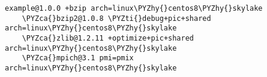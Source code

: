 \begin{Verbatim}[commandchars=\\\{\},fontsize=\footnotesize]
example@1.0.0 +bzip arch=linux\PYZhy{}centos8\PYZhy{}skylake
    \PYZca{}bzip2@1.0.8 \PYZti{}debug+pic+shared arch=linux\PYZhy{}centos8\PYZhy{}skylake
    \PYZca{}zlib@1.2.11 +optimize+pic+shared arch=linux\PYZhy{}centos8\PYZhy{}skylake
    \PYZca{}mpich@3.1 pmi=pmix arch=linux\PYZhy{}centos8\PYZhy{}skylake
\end{Verbatim}
